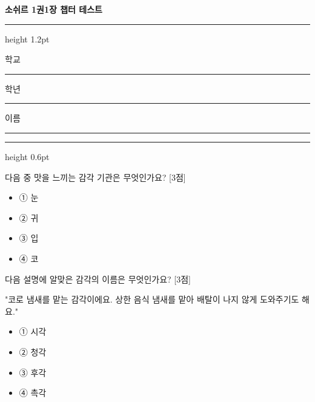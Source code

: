 \documentclass[12pt,a4paper]{article}
\newcommand{\qnum}[1]{%
  \tikz[baseline=(num.base)]{%
    \node[circle, fill=numCircle, text=white, inner sep=0pt,
          minimum size=18pt, font=\small\bfseries] (num) {#1};%
  }%
}
\newcommand{\pts}[1]{%
  \hfill\textcolor{ptsBadge}{[#1점]}%
}
\begin{document}
\begin{center}
{\Large\bfseries 소쉬르 1권\quad 1장 챕터 테스트}
\end{center}
\vspace{3mm}
{\color{korfarmBrown}\hrule height 1.2pt}
\vspace{5mm}
\begin{center}
학교\enspace\rule{3.5cm}{0.4pt}\hspace{12mm}%
학년\enspace\rule{2.5cm}{0.4pt}\hspace{12mm}%
이름\enspace\rule{3.5cm}{0.4pt}
\end{center}
\vspace{5mm}
{\color{korfarmBrown}\hrule height 0.6pt}
\vspace{6mm}
\begin{samepage}
\vspace{4mm}
\qnum{1}\enspace 다음 중 맛을 느끼는 감각 기관은 무엇인가요? \pts{3}

\vspace{3mm}
\begin{itemize}[leftmargin=1.5em, labelsep=0pt, label={}, itemsep=2pt, parsep=0pt]
  \item ① 눈
  \item ② 귀
  \item ③ 입
  \item ④ 코
\end{itemize}
\end{samepage}

\begin{samepage}
\vspace{4mm}
\qnum{2}\enspace 다음 설명에 알맞은 감각의 이름은 무엇인가요? \pts{3}

\vspace{3mm}
\begin{tcolorbox}[bogi]
"코로 냄새를 맡는 감각이에요. 상한 음식 냄새를 맡아 배탈이 나지 않게 도와주기도 해요."
\end{tcolorbox}
\vspace{3mm}
\begin{itemize}[leftmargin=1.5em, labelsep=0pt, label={}, itemsep=2pt, parsep=0pt]
  \item ① 시각
  \item ② 청각
  \item ③ 후각
  \item ④ 촉각
\end{itemize}
\end{samepage}
\end{document}
